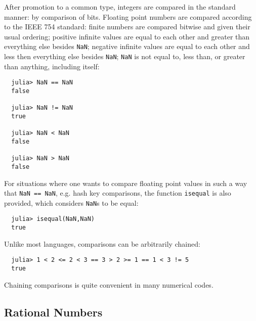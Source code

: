 \documentclass{article}
\begin{document}
After promotion to a common type, integers are compared in the standard manner:
by comparison of bits.
Floating point numbers are compared according to the IEEE 754 standard:
finite numbers are compared bitwise and given their usual ordering;
positive infinite values are equal to each other and greater than everything else besides \verb|NaN|;
negative infinite values are equal to each other and less then everything else besides \verb|NaN|;
\verb|NaN| is not equal to, less than, or greater than anything, including itself:
\begin{verbatim}
  julia> NaN == NaN
  false

  julia> NaN != NaN
  true

  julia> NaN < NaN
  false

  julia> NaN > NaN
  false
\end{verbatim}
For situations where one wants to compare floating point values in such a way that \verb|NaN == NaN|, e.g. hash key comparisons, the function \verb|isequal| is also provided, which considers \verb|NaN|s to be equal:
\begin{verbatim}
  julia> isequal(NaN,NaN)
  true
\end{verbatim}
Unlike most languages, comparisons can be arbitrarily chained:
\begin{verbatim}
  julia> 1 < 2 <= 2 < 3 == 3 > 2 >= 1 == 1 < 3 != 5
  true
\end{verbatim}
Chaining comparisons is quite convenient in many numerical codes.

\subsection{Rational Numbers}
\end{document}
